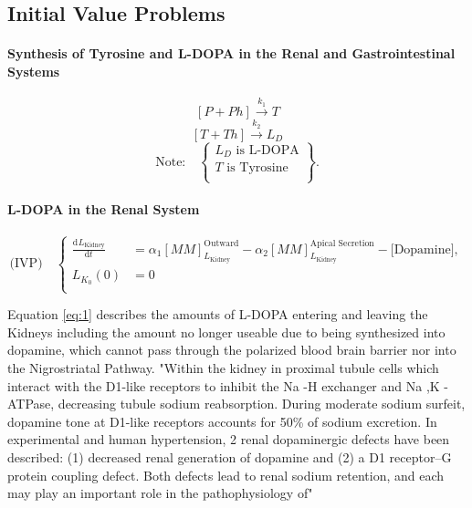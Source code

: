 \documentclass[smallextended]{svjour3}
\newcommand{\od}[3][]{\ensuremath{\frac{\mathrm{d}^{#1} {#2}}{\mathrm{d}{#3}^{#1}}}}
\begin{document}
\subsection{ Initial Value Problems }
\paragraph{Synthesis of Tyrosine and L-DOPA in the Renal and Gastrointestinal Systems}
$${[P+Ph]}\overset{k_1}{\longrightarrow}T$$
$${[T +Th]}\overset{k_2}{\longrightarrow}L_D$$
$$                                                                      %
\text{Note:}\quad 
\left\{
\begin{aligned}
L_D \text{  is L-DOPA} \\
T \text{  is Tyrosine} \\
\end{aligned}
\right\}.
$$
%
\paragraph{L-DOPA in the Renal System}
\begin{equation} 
\label{eq:1}
\text{(IVP)}\quad 
\left\{
\begin{aligned}
\od{L_{\text{Kidney}}}{t} &= \alpha_1 [MM]_{L_{\text{Kidney}}}^{\text{Outward}} - \alpha_2 [MM]_{L_{\text{Kidney}}}^{\text{Apical Secretion}} - \text{[Dopamine]}, \\
L_{K_0}(0) &= 0 \\
\end{aligned}
\right.
\end{equation}

 Equation \ref{eq:1} describes the amounts of L-DOPA entering and leaving the Kidneys including the amount no longer useable due to being synthesized into dopamine, which cannot pass through the polarized blood brain barrier nor into the Nigrostriatal Pathway. "Within the kidney in proximal tubule cells which interact with the D1-like receptors to inhibit the Na -H  exchanger and Na ,K -ATPase, decreasing tubule sodium reabsorption. During moderate sodium surfeit, dopamine tone at D1-like receptors accounts for  50\%  of sodium excretion. In experimental and human hypertension, 2 renal dopaminergic defects have been described: (1) decreased renal generation of dopamine and (2) a D1 receptor–G protein coupling defect. Both defects lead to renal sodium retention, and each may play an important role in the pathophysiology of" \cite{Ref16}
\end{document}
